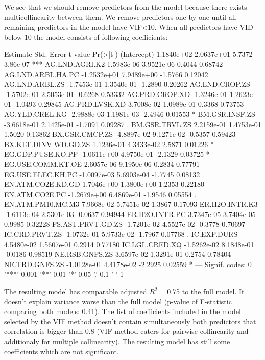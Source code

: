 \documentclass[a4paper]{article}
\begin{document}
We see that we should remove predictors from the model because there exists
multicollinearity between them. We remove predictors one by one until all
remaining predictors in the model have VIF<10. When all predictors have VID
below 10 the model consists of following coefficients: 
\begin{Schunk}
\begin{Soutput}
                        Estimate  Std. Error t value Pr(>|t|)    
(Intercept)           1.1840e+02  2.0637e+01  5.7372 3.86e-07 ***
AG.LND.AGRI.K2        1.5983e-06  3.9521e-06  0.4044  0.68742    
AG.LND.ARBL.HA.PC    -1.2532e+01  7.9489e+00 -1.5766  0.12042    
AG.LND.ARBL.ZS       -1.7453e-01  1.3540e-01 -1.2890  0.20262    
AG.LND.CROP.ZS       -1.5702e-01  2.5053e-01 -0.6268  0.53332    
AG.PRD.CROP.XD       -1.3246e-01  1.2623e-01 -1.0493  0.29845    
AG.PRD.LVSK.XD        3.7008e-02  1.0989e-01  0.3368  0.73753    
AG.YLD.CREL.KG       -2.9888e-03  1.1981e-03 -2.4946  0.01553 *  
BM.GSR.INSF.ZS       -3.6618e-01  2.1425e-01 -1.7091  0.09287 .  
BM.GSR.TRVL.ZS        2.2159e-01  1.4753e-01  1.5020  0.13862    
BX.GSR.CMCP.ZS       -4.8897e-02  9.1271e-02 -0.5357  0.59423    
BX.KLT.DINV.WD.GD.ZS  1.1236e-01  4.3433e-02  2.5871  0.01226 *  
EG.GDP.PUSE.KO.PP    -1.0611e+00  4.9750e-01 -2.1329  0.03725 *  
EG.USE.COMM.KT.OE     2.6057e-06  9.1950e-06  0.2834  0.77791    
EG.USE.ELEC.KH.PC    -1.0097e-03  5.6903e-04 -1.7745  0.08132 .  
EN.ATM.CO2E.KD.GD     1.7046e+00  1.3800e+00  1.2353  0.22180    
EN.ATM.CO2E.PC       -1.2679e+00  6.4869e-01 -1.9546  0.05554 .  
EN.ATM.PM10.MC.M3     7.9668e-02  5.7451e-02  1.3867  0.17093    
ER.H2O.INTR.K3       -1.6113e-04  2.5301e-03 -0.0637  0.94944    
ER.H2O.INTR.PC        3.7347e-05  3.7404e-05  0.9985  0.32228    
FS.AST.PRVT.GD.ZS    -1.7201e-02  4.5527e-02 -0.3778  0.70697    
IC.CRD.PRVT.ZS       -1.0732e-01  5.9733e-02 -1.7967  0.07768 .  
IC.EXP.DURS           4.5480e-02  1.5607e-01  0.2914  0.77180    
IC.LGL.CRED.XQ       -1.5262e-02  8.1848e-01 -0.0186  0.98519    
NE.RSB.GNFS.ZS        3.6597e-02  1.3291e-01  0.2754  0.78404    
NE.TRD.GNFS.ZS       -1.0128e-01  4.4178e-02 -2.2925  0.02559 *  
---
Signif. codes:  0 '***' 0.001 '**' 0.01 '*' 0.05 '.' 0.1 ' ' 1
\end{Soutput}
\end{Schunk}

The resulting model has comparable adjusted
$R^2=$0.75 to the full model.
It doesn't explain variance worse than the full model (p-value of F-statistic
comparing both models:
0.41). The list of
coefficients included in the model selected by the VIF method doesn't contain simultaneously both predictors that correlation is bigger than 0.8 (VIF method caters for pairwise collinearity and additionaly for
multiple collinearity). The resulting model has still some coefficients which
are not significant.
\end{document}
